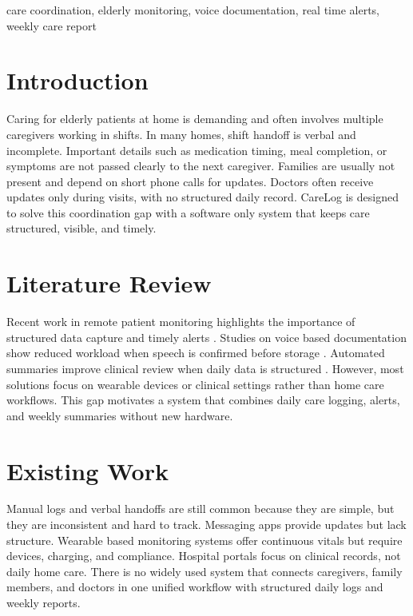 \documentclass[conference]{IEEEtran}
\begin{document}
\begin{IEEEkeywords}
care coordination, elderly monitoring, voice documentation, real time alerts, weekly care report
\end{IEEEkeywords}

\section{Introduction}
Caring for elderly patients at home is demanding and often involves multiple caregivers working in shifts. In many homes, shift handoff is verbal and incomplete. Important details such as medication timing, meal completion, or symptoms are not passed clearly to the next caregiver. Families are usually not present and depend on short phone calls for updates. Doctors often receive updates only during visits, with no structured daily record. CareLog is designed to solve this coordination gap with a software only system that keeps care structured, visible, and timely.

\section{Literature Review}
Recent work in remote patient monitoring highlights the importance of structured data capture and timely alerts \cite{b1,b3}. Studies on voice based documentation show reduced workload when speech is confirmed before storage \cite{b4}. Automated summaries improve clinical review when daily data is structured \cite{b2}. However, most solutions focus on wearable devices or clinical settings rather than home care workflows. This gap motivates a system that combines daily care logging, alerts, and weekly summaries without new hardware.

\section{Existing Work}
Manual logs and verbal handoffs are still common because they are simple, but they are inconsistent and hard to track. Messaging apps provide updates but lack structure. Wearable based monitoring systems offer continuous vitals but require devices, charging, and compliance. Hospital portals focus on clinical records, not daily home care. There is no widely used system that connects caregivers, family members, and doctors in one unified workflow with structured daily logs and weekly reports.
\end{document}
